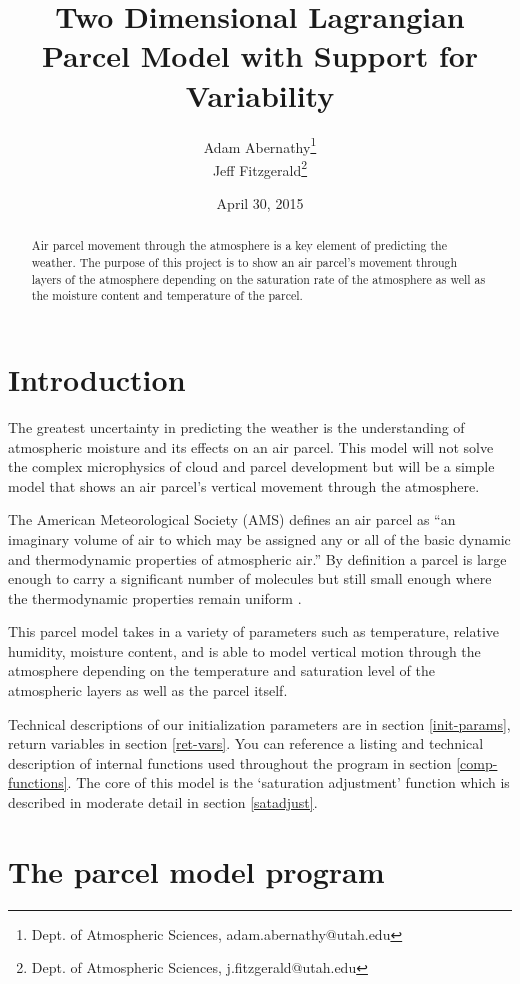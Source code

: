 \documentclass{article}
\title{Two Dimensional Lagrangian Parcel Model with Support for Variability}
\author{Adam Abernathy\footnote{Dept. of Atmospheric Sciences, adam.abernathy@utah.edu} \\ Jeff Fitzgerald\footnote{Dept. of Atmospheric Sciences, j.fitzgerald@utah.edu}}
\date{April 30, 2015}
\begin{document}
\maketitle

\begin{abstract}
Air parcel movement through the atmosphere is a key element of predicting the weather. The purpose of this project is to show an air parcel's movement through layers of the atmosphere depending on the saturation rate of the atmosphere as well as the moisture content and temperature of the parcel. 
\end{abstract}


\section{Introduction}

The greatest uncertainty in predicting the weather is the understanding of atmospheric moisture and its effects on an air parcel. This model will not solve the complex microphysics of cloud and parcel development but will be a simple model that shows an air parcel's vertical movement through the atmosphere. 

The American Meteorological Society (AMS) defines an air parcel as ``an imaginary volume of air to which may be assigned any or all of the basic dynamic and thermodynamic properties of atmospheric air.'' By definition a parcel is large enough to carry a significant number of molecules but still small enough where the thermodynamic properties remain uniform \cite{ams-gloss-parcel}.

This parcel model takes in a variety of parameters such as temperature, relative humidity, moisture content, and is able to model vertical motion through the atmosphere depending on the temperature and saturation level of the atmospheric layers as well as the parcel itself.

Technical descriptions of our initialization parameters are in section \ref{init-params}, return variables in section \ref{ret-vars}. You can reference a listing and technical description of internal functions used throughout the program in section \ref{comp-functions}. The core of this model is the `saturation adjustment' function which is described in moderate detail in section \ref{satadjust}.


\newpage
\section{The parcel model program}
\end{document}
